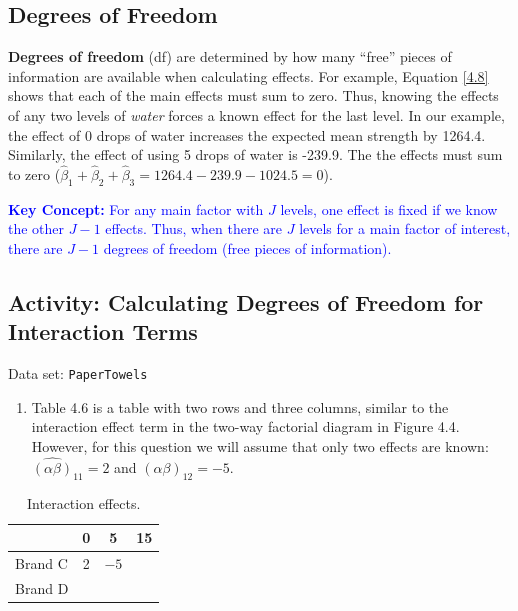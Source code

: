 \documentclass[
]{book}
\providecommand{\tightlist}{%
  \setlength{\itemsep}{0pt}\setlength{\parskip}{0pt}}
\begin{document}
\hypertarget{degrees-of-freedom}{%
\subsection*{Degrees of Freedom}\label{degrees-of-freedom}}

\textbf{Degrees of freedom} (df) are determined by how many ``free'' pieces of information are available when calculating effects. For example, Equation \ref{4.8} shows that each of the main effects must sum to zero. Thus, knowing the effects of any two levels of \emph{water} forces a known effect for the last level. In our example, the effect of 0 drops of water increases the expected mean strength by 1264.4. Similarly, the effect of using 5 drops of water is -239.9. The the effects must sum to zero (\(\hat{\beta}_1 + \hat{\beta}_2 + \hat{\beta}_3 = 1264.4 - 239.9 - 1024.5 = 0\)).

\textbf{\textcolor{blue}{Key Concept:}}
\textcolor{blue}{For any main factor with $J$ levels, one effect is fixed if we know the other $J-1$ effects. Thus, when there are $J$ levels for a main factor of interest, there are $J-1$ degrees of freedom (free pieces of information).}

\hypertarget{activity-calculating-degrees-of-freedom-for-interaction-terms}{%
\subsection*{Activity: Calculating Degrees of Freedom for Interaction Terms}\label{activity-calculating-degrees-of-freedom-for-interaction-terms}}

Data set: \texttt{PaperTowels}

\begin{enumerate}
\def\labelenumi{\arabic{enumi}.}
\setcounter{enumi}{30}
\tightlist
\item
  Table 4.6 is a table with two rows and three columns, similar to the interaction effect term in the two-way factorial diagram in Figure 4.4. However, for this question we will assume that only two effects are known: \(\widehat{(\alpha\beta)}_{11} = 2\) and \(\widehat{(\alpha\beta)}_{12} = -5\).
\end{enumerate}

\begin{table}[!h]
\centering
\caption{\label{tab:tab6}Interaction effects.}
\centering
\begin{tabular}[t]{lccc}
\toprule
  & 0 & 5 & 15\\
\midrule
Brand C & 2 & $-5$ & \\
Brand D &  &  & \\
\bottomrule
\end{tabular}
\end{table}
\end{document}
